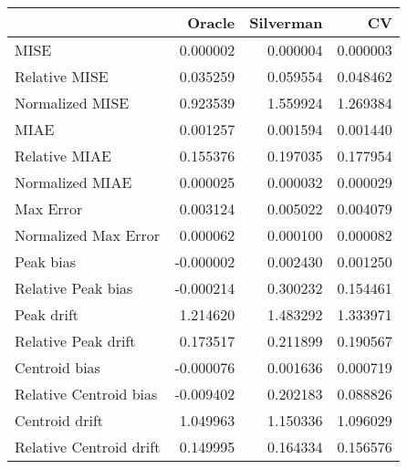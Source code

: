 \begin{tabular}{lrrr}
  \hline
 & Oracle & Silverman & CV \\ 
  \hline
MISE & 0.000002 & 0.000004 & 0.000003 \\ 
  Relative MISE & 0.035259 & 0.059554 & 0.048462 \\ 
  Normalized MISE & 0.923539 & 1.559924 & 1.269384 \\ 
  MIAE & 0.001257 & 0.001594 & 0.001440 \\ 
  Relative MIAE & 0.155376 & 0.197035 & 0.177954 \\ 
  Normalized MIAE & 0.000025 & 0.000032 & 0.000029 \\ 
  Max Error & 0.003124 & 0.005022 & 0.004079 \\ 
  Normalized Max Error & 0.000062 & 0.000100 & 0.000082 \\ 
  Peak bias & -0.000002 & 0.002430 & 0.001250 \\ 
  Relative Peak bias & -0.000214 & 0.300232 & 0.154461 \\ 
  Peak drift & 1.214620 & 1.483292 & 1.333971 \\ 
  Relative Peak drift & 0.173517 & 0.211899 & 0.190567 \\ 
  Centroid bias & -0.000076 & 0.001636 & 0.000719 \\ 
  Relative Centroid bias & -0.009402 & 0.202183 & 0.088826 \\ 
  Centroid drift & 1.049963 & 1.150336 & 1.096029 \\ 
  Relative Centroid drift & 0.149995 & 0.164334 & 0.156576 \\ 
   \hline
\end{tabular}
